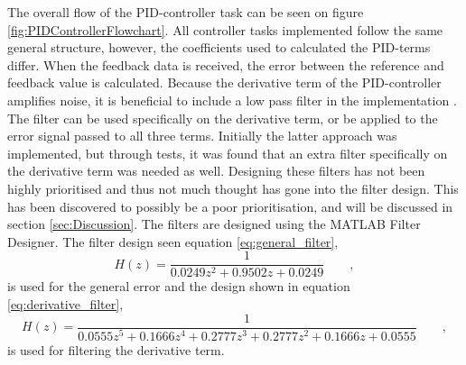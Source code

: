 \documentclass[../../main.tex]{subfiles}
\begin{document}
The overall flow of the PID-controller task can be seen on figure \ref{fig:PIDControllerFlowchart}. All controller tasks implemented follow the same general structure, however, the coefficients used to calculated the PID-terms differ. When the feedback data is received, the error between the reference and feedback value is calculated. Because the derivative term of the PID-controller amplifies noise, it is beneficial to include a low pass filter in the implementation \cite{PID_Lecture}. The filter can be used specifically on the derivative term, or be applied to the error signal passed to all three terms. Initially the latter approach was implemented, but through tests, it was found that an extra filter specifically on the derivative term was needed as well. Designing these filters has not been highly prioritised and thus not much thought has gone into the filter design. This has been discovered to possibly be a poor prioritisation, and will be discussed in section \ref{sec:Discussion}. The filters are designed using the MATLAB Filter Designer. The filter design seen equation \ref{eq:general_filter},
\begin{equation}\label{eq:general_filter}
    H(z) = \frac{1}{0.0249z^2 + 0.9502z + 0.0249} \qquad ,
\end{equation}
is used for the general error and the design shown in equation \ref{eq:derivative_filter},
\begin{equation}\label{eq:derivative_filter}
    H(z) = \frac{1}{0.0555z^5 + 0.1666z^4 + 0.2777z^3 + 0.2777z^2 + 0.1666z + 0.0555} \qquad ,
\end{equation}
is used for filtering the derivative term.





\end{document}
